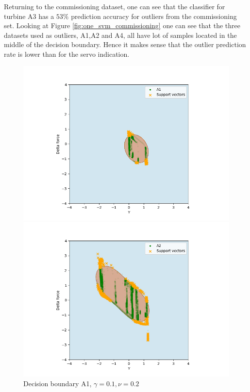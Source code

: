             Returning to the commissioning dataset, one can see that the classifier for turbine A3 has a $53\%$ prediction accuracy for outliers from the commissioning set. Looking at Figure \ref{fig:one_svm_commissioning} one can see that the three datasets used as outliers, A1,A2 and A4, all have lot of samples located in the middle of the decision boundary. Hence it makes sense that the outlier prediction rate is lower than for the servo indication. 
            
            \begin{figure}[]
                \begin{minipage}[b]{0.5\linewidth}
                    \centering
                    \includegraphics[width = \textwidth]{figures/analysis/oneclass_servo/SVM_one_class_A1_startup_nu_01_gamma_02.png}
                    \caption*{Decision boundary A1, $\gamma = 0.1, \nu = 0.2$}
                \end{minipage}
                \hfill
                \begin{minipage}[b]{0.5\linewidth}
                    \centering
                    \includegraphics[width = \textwidth]{figures/analysis/oneclass_servo/SVM_one_class_A2_startup_nu_01_gamma_02.png}

\end{minipage}
\end{figure}
